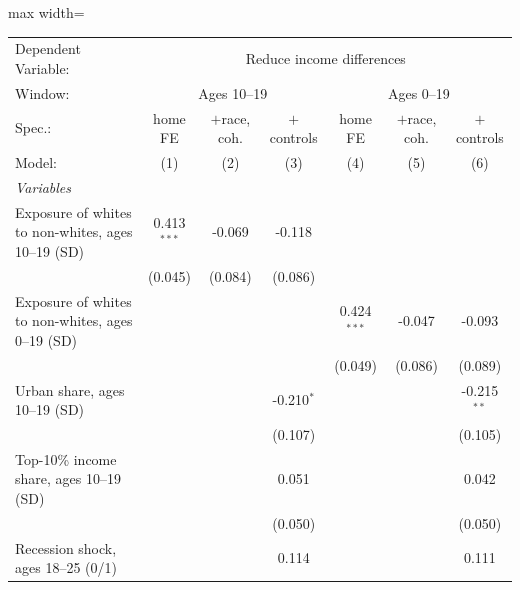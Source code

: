       \begin{adjustbox}{max width=\linewidth}
   \begin{tabular}{lcccccc}
      \tabularnewline \midrule \midrule
      Dependent Variable: & \multicolumn{6}{c}{Reduce income differences}\\
      Window: & \multicolumn{3}{c}{Ages 10--19} & \multicolumn{3}{c}{Ages 0--19} \\ 
      Spec.:                                             & home FE       & $+$race, coh. & $+$controls  & home FE       & $+$race, coh. & $+$controls \\   
      Model:                                             & (1)           & (2)           & (3)          & (4)           & (5)           & (6)\\  
      \midrule
      \emph{Variables}\\
      Exposure of whites to non-whites, ages 10--19 (SD) & 0.413$^{***}$ & -0.069        & -0.118       &               &               &   \\   
                                                         & (0.045)       & (0.084)       & (0.086)      &               &               &   \\   
      Exposure of whites to non-whites, ages 0--19 (SD)  &               &               &              & 0.424$^{***}$ & -0.047        & -0.093\\   
                                                         &               &               &              & (0.049)       & (0.086)       & (0.089)\\   
      Urban share, ages 10--19 (SD)                      &               &               & -0.210$^{*}$ &               &               & -0.215$^{**}$\\   
                                                         &               &               & (0.107)      &               &               & (0.105)\\   
      Top-10\% income share, ages 10--19 (SD)            &               &               & 0.051        &               &               & 0.042\\   
                                                         &               &               & (0.050)      &               &               & (0.050)\\   
      Recession shock, ages 18--25 (0/1)                 &               &               & 0.114        &               &               & 0.111\\   

\end{tabular}
\end{adjustbox}
